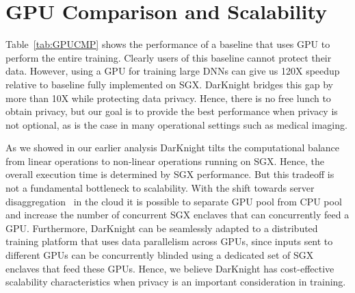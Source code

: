 \section{GPU Comparison and Scalability}
Table~\ref{tab:GPUCMP} shows the performance of a baseline that uses GPU to perform the entire training. Clearly users of this baseline cannot protect their data. However, using a GPU for training large DNNs can give us 120X speedup relative to baseline fully implemented on SGX.  DarKnight bridges  this gap by more than 10X while protecting data privacy. Hence, there is no free lunch to obtain privacy, but our goal is to provide the best performance when privacy is not optional, as is the case in many operational settings such as medical imaging. 

\begin{table}[htb]
\caption{Speedup in GPU relative to SGX in VGG16 Training on ImageNet. The baseline is implemented fully on Intel SGX}
\label{tab:GPUCMP}
\centering
{}
\end{table}

As we showed in our earlier analysis DarKnight tilts the computational balance from linear operations to non-linear operations running on SGX. Hence, the overall execution time is determined by SGX performance. But this tradeoff is not a fundamental bottleneck to scalability. With the shift towards server disaggregation~\cite{lim2009disaggregated,guleria2019quadd} in the cloud it is possible to separate GPU pool from CPU pool and increase the number of concurrent SGX enclaves that can concurrently feed a GPU. Furthermore, DarKnight can be seamlessly adapted to a distributed training platform that uses data parallelism across GPUs, since inputs sent to different GPUs can be concurrently blinded using a dedicated set of SGX enclaves that feed these GPUs. Hence, we believe DarKnight has cost-effective scalability characteristics when privacy is an important consideration in training.  
